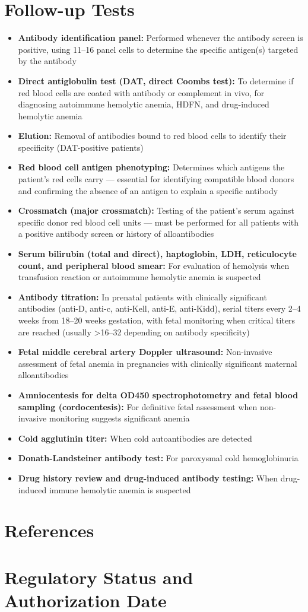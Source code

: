 \section*{Follow-up Tests}
\begin{itemize}
  \item \textbf{Antibody identification panel:} Performed whenever the antibody screen is positive, using 11--16 panel cells to determine the specific antigen(s) targeted by the antibody
  \item \textbf{Direct antiglobulin test (DAT, direct Coombs test):} To determine if red blood cells are coated with antibody or complement in vivo, for diagnosing autoimmune hemolytic anemia, HDFN, and drug-induced hemolytic anemia
  \item \textbf{Elution:} Removal of antibodies bound to red blood cells to identify their specificity (DAT-positive patients)
  \item \textbf{Red blood cell antigen phenotyping:} Determines which antigens the patient's red cells carry --- essential for identifying compatible blood donors and confirming the absence of an antigen to explain a specific antibody
  \item \textbf{Crossmatch (major crossmatch):} Testing of the patient's serum against specific donor red blood cell units --- must be performed for all patients with a positive antibody screen or history of alloantibodies
  \item \textbf{Serum bilirubin (total and direct), haptoglobin, LDH, reticulocyte count, and peripheral blood smear:} For evaluation of hemolysis when transfusion reaction or autoimmune hemolytic anemia is suspected
  \item \textbf{Antibody titration:} In prenatal patients with clinically significant antibodies (anti-D, anti-c, anti-Kell, anti-E, anti-Kidd), serial titers every 2--4 weeks from 18--20 weeks gestation, with fetal monitoring when critical titers are reached (usually >16--32 depending on antibody specificity)
  \item \textbf{Fetal middle cerebral artery Doppler ultrasound:} Non-invasive assessment of fetal anemia in pregnancies with clinically significant maternal alloantibodies
  \item \textbf{Amniocentesis for delta OD450 spectrophotometry and fetal blood sampling (cordocentesis):} For definitive fetal assessment when non-invasive monitoring suggests significant anemia
  \item \textbf{Cold agglutinin titer:} When cold autoantibodies are detected
  \item \textbf{Donath-Landsteiner antibody test:} For paroxysmal cold hemoglobinuria
  \item \textbf{Drug history review and drug-induced antibody testing:} When drug-induced immune hemolytic anemia is suspected
\end{itemize}

\section*{References}



\clearpage
\section*{Regulatory Status and Authorization Date}

\clearpage
